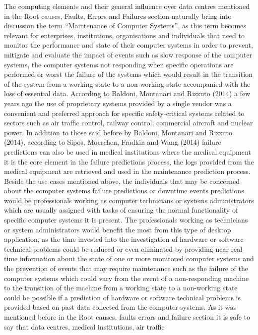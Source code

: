 The computing elements and their general influence over data centres mentioned in the Root causes, Faults, Errors and
Failures section naturally bring into discussion the term “Maintenance of Computer Systems”, as this term becomes
relevant for enterprises, institutions, organisations and individuals that need to monitor the performance and state
of their computer systems in order to prevent, mitigate and evaluate the impact of events such as slow response of
the computer systems, the computer systems not responding when specific operations are performed or worst the
failure of the systems which would result in the transition of the system from a working state to a non-working
state accompanied with the loss of essential data. According to Baldoni, Montanari and Rizzuto (2014) a few years
ago the use of proprietary systems provided by a single vendor was a convenient and preferred approach for specific
safety-critical systems related to sectors such as air traffic control, railway control, commercial aircraft and
nuclear power. In addition to those said before by Baldoni, Montanari and Rizzuto (2014), according to Sipos, Moerchen,
Fradkin and Wang (2014) failure predictions can also be used in medical institutions where the medical equipment
it is the core element in the failure predictions process, the logs provided from the medical equipment are
retrieved and used in the maintenance prediction process. Beside the use cases mentioned above, the individuals
that may be concerned about the computer systems failure predictions or downtime events predictions would be
professionals working as computer technicians or systems administrators which are usually assigned with tasks of
ensuring the normal functionality of specific computer systems it is present. The professionals working as
technicians or system administrators would benefit the most from this type of desktop application, as the time
invested into the investigation of hardware or software technical problems could be reduced or even eliminated
by providing near real-time information about the state of one or more monitored computer systems and the
prevention of events that may require maintenance such as the failure of the computer systems which could
vary from the event of a non-responding machine to the transition of the machine from a working state to a
non-working state could be possible if a prediction of hardware or software technical problems is provided
based on past data collected from the computer systems. As it was mentioned before in the Root causes,
faults errors and failure section it is safe to say that data centres, medical institutions, air traffic
